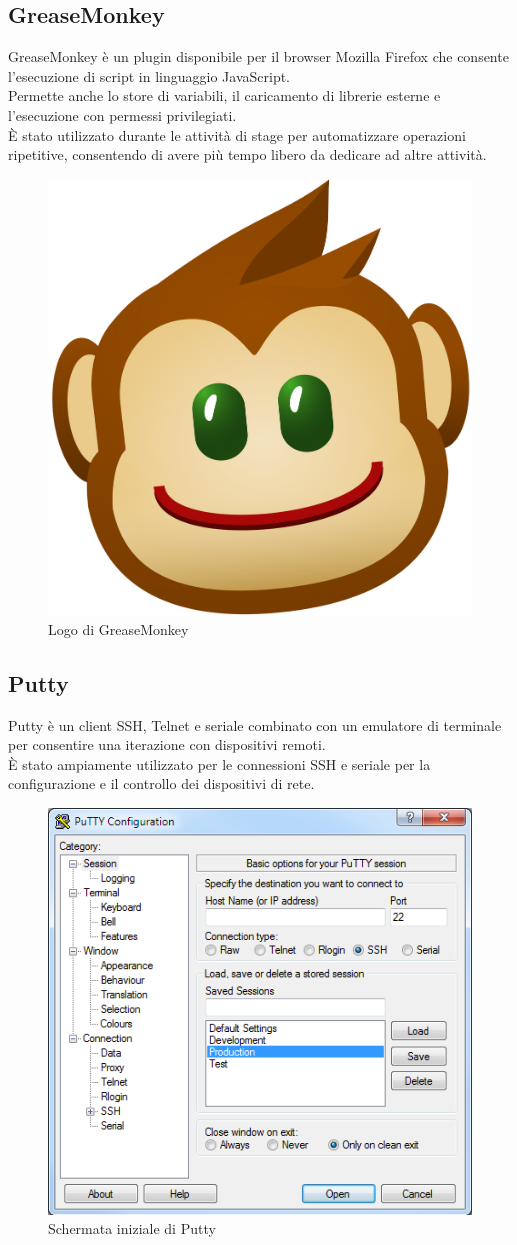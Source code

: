 \documentclass[Tesi.tex]{subfiles}
\begin{document}
\subsection{GreaseMonkey}
GreaseMonkey è un plugin disponibile per il browser Mozilla Firefox che consente l'esecuzione di script in linguaggio JavaScript. \\
Permette anche lo store di variabili, il caricamento di librerie esterne e l'esecuzione con permessi privilegiati. \\
\`{E} stato utilizzato durante le attività di stage per automatizzare operazioni ripetitive, consentendo di avere più tempo libero da dedicare ad altre attività.
\begin{figure}[H]
	\centering
	\includegraphics[width=0.14\linewidth]{"images/logo/GreaseMonkey_logo"}
	\caption{Logo di GreaseMonkey}
	\label{fig:Logo di GreaseMonkey}
\end{figure}

\subsection{Putty}
Putty è un client SSH, Telnet e seriale combinato con un emulatore di terminale per consentire una iterazione con dispositivi remoti. \\
\`{E} stato ampiamente utilizzato per le connessioni SSH e seriale per la configurazione e il controllo dei dispositivi di rete.
\begin{figure}[H]
	\centering
	\includegraphics[width=0.62\linewidth]{"images/putty"}
	\caption{Schermata iniziale di Putty}
	\label{fig:Schermata iniziale di Putty}
\end{figure}
\end{document}
